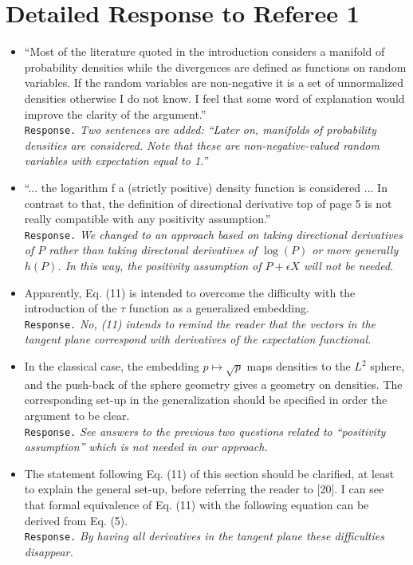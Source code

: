 \documentclass[a4paper,12pt]{article}
\begin{document}
\section{Detailed Response to Referee 1}
\begin{itemize}
\item ``Most of the literature quoted in the introduction considers a manifold
of probability densities while the divergences are defined as functions on random
variables. If the random variables are non-negative it is a set of unnormalized
densities otherwise I do not know. I feel that some word of explanation would
improve the clarity of the argument.'' \\
{\tt Response.} {\it Two sentences are added: ``Later on, manifolds of probability densities are considered.
Note that these are non-negative-valued random variables with expectation equal to 1.'' }

\item ``... the logarithm f a (strictly positive) density function is considered ... In contrast to that, the definition
of directional derivative top of page 5 is not really compatible with any positivity assumption.'' \\
{\tt Response.} {\it 
We changed to an approach based on taking directional derivatives of $P$ rather than taking directonal derivatives of $\log(P)$ or more generally $h(P)$. In this way, the positivity assumption of $P+ \epsilon X$ will not be needed. 
}

\item Apparently, Eq. (11) is intended to overcome the difficulty with the
introduction of the $\tau$ function as a generalized embedding. \\
{\tt Response.} {\it No, (11) intends to remind the reader that the vectors in the tangent plane correspond with derivatives of the expectation functional. }


\item In the classical case, the embedding $p\mapsto\sqrt p$ maps densities to the $L^2$ sphere, and the push-back of
the sphere geometry gives a geometry on densities. The corresponding set-up in
the generalization should be specified in order the argument to be clear. \\
{\tt Response.} {\it See answers to the previous two questions related to ``positivity assumption'' which is not needed in our approach.}


\item The statement following Eq. (11) of this section should be clarified, at least to explain
the general set-up, before referring the reader to [20]. I can see that formal
equivalence of Eq. (11) with the following equation can be derived from Eq. (5). \\
{\tt Response.}
{\it 
By having all derivatives in the tangent plane these difficulties disappear.
}



\end{itemize}
\end{document}
